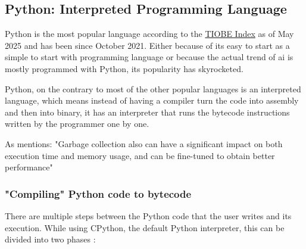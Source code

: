 \subsection{Python: Interpreted Programming Language}
Python is the most popular language according to the \href{https://www.tiobe.com/tiobe-index/}{TIOBE Index} as of May 2025 and has been since October 2021. Either because of its easy to start as a simple to start with programming language or because the actual trend of \gls{ai} is mostly programmed with Python, its popularity has skyrocketed.

Python, on the contrary to most of the other popular languages is an interpreted language, which means instead of having a compiler turn the code into assembly and then into binary, it has an interpreter that runs the \gls{bytecode} instructions written by the programmer one by one.

As \cite{10.1145/1103845.1094836} mentions: "Garbage collection also can have a significant impact on both execution time and memory usage, and can be fine-tuned to obtain better performance"

\subsubsection{"Compiling" Python code to \gls{bytecode}}
There are multiple steps between the Python code that the user writes and its execution. While using \gls{CPython}, the default Python interpreter, this can be divided into two phases \cite{cpython-docs}:





